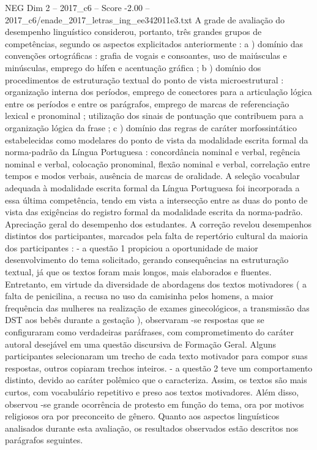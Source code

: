 \begin{textsample}{NEG Dim 2 – 2017\_c6 – Score -2.00 – 2017\_c6/enade\_2017\_letras\_ing\_ee342011e3.txt}
A grade de avaliação do desempenho linguístico considerou, portanto, três grandes grupos de competências, segundo os aspectos explicitados anteriormente : a ) domínio das convenções ortográficas : grafia de vogais e consoantes, uso de maiúsculas e minúsculas, emprego do hífen e acentuação gráfica ; b ) domínio dos procedimentos de estruturação textual do ponto de vista microestrutural : organização interna dos períodos, emprego de conectores para a articulação lógica entre os períodos e entre os parágrafos, emprego de marcas de referenciação lexical e pronominal ; utilização dos sinais de pontuação que contribuem para a organização lógica da frase ; c ) domínio das regras de caráter morfossintático estabelecidas como modelares do ponto de vista da modalidade escrita formal da norma-padrão da Língua Portuguesa : concordância nominal e verbal, regência nominal e verbal, colocação pronominal, flexão nominal e verbal, correlação entre tempos e modos verbais, ausência de marcas de oralidade.
A seleção vocabular adequada à modalidade escrita formal da Língua Portuguesa foi incorporada a essa última competência, tendo em vista a intersecção entre as duas do ponto de vista das exigências do registro formal da modalidade escrita da norma-padrão.
Apreciação geral do desempenho dos estudantes.
A correção revelou desempenhos distintos dos participantes, marcados pela falta de repertório cultural da maioria dos participantes : - a questão 1 propiciou a oportunidade de maior desenvolvimento do tema solicitado, gerando consequências na estruturação textual, já que os textos foram mais longos, mais elaborados e fluentes.
Entretanto, em virtude da diversidade de abordagens dos textos motivadores ( a falta de penicilina, a recusa no uso da camisinha pelos homens, a maior frequência das mulheres na realização de exames ginecológicos, a transmissão das DST aos bebês durante a gestação ), observaram -se respostas que se configuraram como verdadeiras paráfrases, com comprometimento do caráter autoral desejável em uma questão discursiva de Formação Geral.
Alguns participantes selecionaram um trecho de cada texto motivador para compor suas respostas, outros copiaram trechos inteiros. - a questão 2 teve um comportamento distinto, devido ao caráter polêmico que o caracteriza.
Assim, os textos são mais curtos, com vocabulário repetitivo e preso aos textos motivadores.
Além disso, observou -se grande ocorrência de protesto em função do tema, ora por motivos religiosos ora por preconceito de gênero.
Quanto aos aspectos linguísticos analisados durante esta avaliação, os resultados observados estão descritos nos parágrafos seguintes.

\end{textsample}
